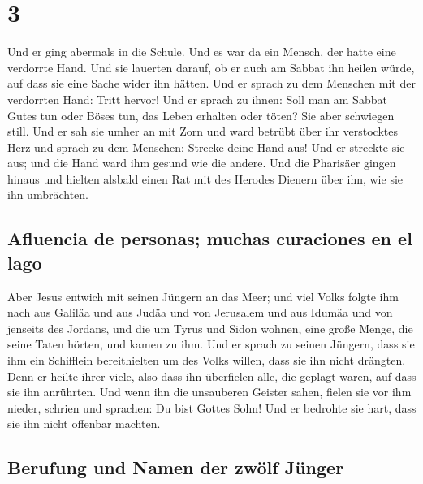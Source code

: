 \hypertarget{section-2}{%
\section{3}\label{section-2}}

 Und er ging abermals in die Schule. Und es war da ein
Mensch, der hatte eine verdorrte Hand.  Und sie lauerten
darauf, ob er auch am Sabbat ihn heilen würde, auf dass sie eine Sache
wider ihn hätten.  Und er sprach zu dem Menschen mit der
verdorrten Hand: Tritt hervor!  Und er sprach zu ihnen:
Soll man am Sabbat Gutes tun oder Böses tun, das Leben erhalten oder
töten? Sie aber schwiegen still.  Und er sah sie umher an
mit Zorn und ward betrübt über ihr verstocktes Herz und sprach zu dem
Menschen: Strecke deine Hand aus! Und er streckte sie aus; und die Hand
ward ihm gesund wie die andere.  Und die Pharisäer gingen
hinaus und hielten alsbald einen Rat mit des Herodes Dienern über ihn,
wie sie ihn umbrächten.

\hypertarget{afluencia-de-personas-muchas-curaciones-en-el-lago}{%
\subsection{Afluencia de personas; muchas curaciones en el
lago}\label{afluencia-de-personas-muchas-curaciones-en-el-lago}}

 Aber Jesus entwich mit seinen Jüngern an das Meer; und
viel Volks folgte ihm nach aus Galiläa und aus Judäa  und
von Jerusalem und aus Idumäa und von jenseits des Jordans, und die um
Tyrus und Sidon wohnen, eine große Menge, die seine Taten hörten, und
kamen zu ihm.  Und er sprach zu seinen Jüngern, dass sie
ihm ein Schifflein bereithielten um des Volks willen, dass sie ihn nicht
drängten.  Denn er heilte ihrer viele, also dass ihn
überfielen alle, die geplagt waren, auf dass sie ihn anrührten.
 Und wenn ihn die unsauberen Geister sahen, fielen sie
vor ihm nieder, schrien und sprachen: Du bist Gottes Sohn!
 Und er bedrohte sie hart, dass sie ihn nicht offenbar
machten.

\hypertarget{berufung-und-namen-der-zwuxf6lf-juxfcnger}{%
\subsection{Berufung und Namen der zwölf
Jünger}\label{berufung-und-namen-der-zwuxf6lf-juxfcnger}}

